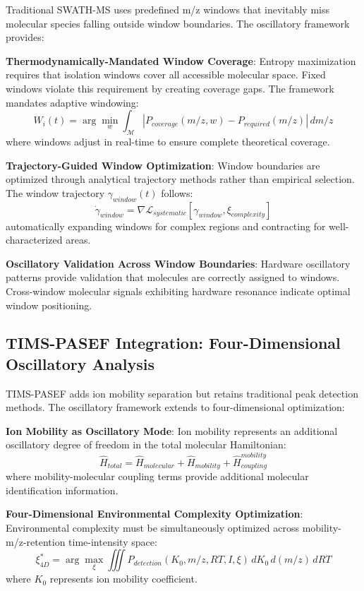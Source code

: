 \documentclass[11pt,a4paper]{article}
\begin{document}
Traditional SWATH-MS uses predefined m/z windows that inevitably miss molecular species falling outside window boundaries. The oscillatory framework provides:

\textbf{Thermodynamically-Mandated Window Coverage}: Entropy maximization requires that isolation windows cover all accessible molecular space. Fixed windows violate this requirement by creating coverage gaps. The framework mandates adaptive windowing:
\begin{equation}
W_i(t) = \arg\min_{w} \int_{\mathcal{M}} |P_{coverage}(m/z, w) - P_{required}(m/z)| \, dm/z
\end{equation}
where windows adjust in real-time to ensure complete theoretical coverage.

\textbf{Trajectory-Guided Window Optimization}: Window boundaries are optimized through analytical trajectory methods rather than empirical selection. The window trajectory $\gamma_{window}(t)$ follows:
\begin{equation}
\dot{\gamma}_{window} = \nabla \mathcal{L}_{systematic}[\gamma_{window}, \xi_{complexity}]
\end{equation}
automatically expanding windows for complex regions and contracting for well-characterized areas.

\textbf{Oscillatory Validation Across Window Boundaries}: Hardware oscillatory patterns provide validation that molecules are correctly assigned to windows. Cross-window molecular signals exhibiting hardware resonance indicate optimal window positioning.

\subsection{TIMS-PASEF Integration: Four-Dimensional Oscillatory Analysis}

TIMS-PASEF adds ion mobility separation but retains traditional peak detection methods. The oscillatory framework extends to four-dimensional optimization:

\textbf{Ion Mobility as Oscillatory Mode}: Ion mobility represents an additional oscillatory degree of freedom in the total molecular Hamiltonian:
\begin{equation}
\hat{H}_{total} = \hat{H}_{molecular} + \hat{H}_{mobility} + \hat{H}_{coupling}^{mobility}
\end{equation}
where mobility-molecular coupling terms provide additional molecular identification information.

\textbf{Four-Dimensional Environmental Complexity Optimization}: Environmental complexity must be simultaneously optimized across mobility-m/z-retention time-intensity space:
\begin{equation}
\xi^*_{4D} = \arg\max_\xi \iiint P_{detection}(K_0, m/z, RT, I, \xi) \, dK_0 \, d(m/z) \, dRT
\end{equation}
where $K_0$ represents ion mobility coefficient.
\end{document}
